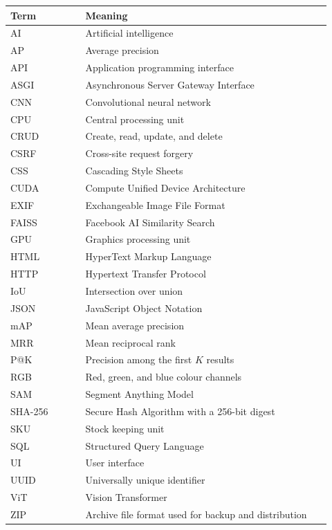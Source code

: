 \begin{ReportTable}
\renewcommand{\arraystretch}{0.97}
\begin{longtable}{@{}L{0.22\linewidth}L{0.72\linewidth}@{}}
\toprule\textbf{Term}&\textbf{Meaning}\\\midrule
AI & Artificial intelligence \\
AP & Average precision \\
API & Application programming interface \\
ASGI & Asynchronous Server Gateway Interface \\
CNN & Convolutional neural network \\
CPU & Central processing unit \\
CRUD & Create, read, update, and delete \\
CSRF & Cross-site request forgery \\
CSS & Cascading Style Sheets \\
CUDA & Compute Unified Device Architecture \\
EXIF & Exchangeable Image File Format \\
FAISS & Facebook AI Similarity Search \\
GPU & Graphics processing unit \\
HTML & HyperText Markup Language \\
HTTP & Hypertext Transfer Protocol \\
IoU & Intersection over union \\
JSON & JavaScript Object Notation \\
mAP & Mean average precision \\
MRR & Mean reciprocal rank \\
P@K & Precision among the first $K$ results \\
RGB & Red, green, and blue colour channels \\
SAM & Segment Anything Model \\
SHA-256 & Secure Hash Algorithm with a 256-bit digest \\
SKU & Stock keeping unit \\
SQL & Structured Query Language \\
UI & User interface \\
UUID & Universally unique identifier \\
ViT & Vision Transformer \\
ZIP & Archive file format used for backup and distribution \\
\bottomrule
\end{longtable}
\end{ReportTable}
\clearpage

